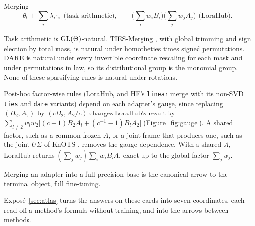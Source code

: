 \begin{example*}{Merging}\label{ex:merging}%
\[
  \theta_0+\textstyle\sum_i\lambda_i\tau_i\ \ \text{(task arithmetic)},\qquad
  \big(\textstyle\sum_iw_iB_i\big)\big(\textstyle\sum_jw_jA_j\big)\ \ \text{(LoraHub)}.
\]
\begin{exVIIlines}
\item[Fibre] Task arithmetic is $\mathrm{GL}(\Theta)$-natural. TIES-Merging \citep{yadav2023ties}, with global trimming and
  sign election by total mass, is natural under homotheties times signed permutations. DARE \citep{yu2023language} is
  natural under every invertible coordinate rescaling for each mask and under permutations in law, so its
  distributional group is the monomial group. None of these sparsifying rules is natural under rotations.
\item[Fibre] Post-hoc factor-wise rules (LoraHub, and HF's \texttt{linear} merge with its non-SVD \texttt{ties} and
  \texttt{dare} variants) depend on each adapter's gauge, since replacing $(B_2,A_2)$ by $(cB_2,A_2/c)$ changes
  LoraHub's result by $\sum_{l\ne2}w_lw_2\big[(c-1)B_2A_l+(c^{-1}-1)B_lA_2\big]$ (Figure~\ref{fig:gauge}). A shared
  factor, such as a common frozen $A$, or a joint frame that produces one, such as the joint $U\Sigma$ of KnOTS
  \citep{stoica2024model}, removes the gauge dependence. With a shared $A$, LoraHub returns
  $(\sum_jw_j)\sum_iw_iB_iA$, exact up to the global factor $\sum_jw_j$.
\item[Merge] Merging an adapter into a full-precision base is the canonical arrow to the terminal object, full
  fine-tuning.
\end{exVIIlines}
\end{example*}

Exposé~\ref{sec:atlas} turns the answers on these cards into seven coordinates, each read off a method's formula
without training, and into the arrows between methods.
